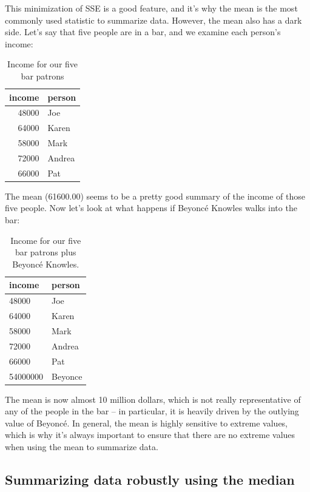 \documentclass[12pt,]{book}
\theoremstyle{definition}
\theoremstyle{definition}
\theoremstyle{definition}
\theoremstyle{remark}
\begin{document}
This minimization of SSE is a good feature, and it's why the mean is the most commonly used statistic to summarize data. However, the mean also has a dark side. Let's say that five people are in a bar, and we examine each person's income:

\begin{table}

\caption{\label{tab:unnamed-chunk-17}Income for our five bar patrons}
\centering
\begin{tabular}[t]{r|l}
\hline
income & person\\
\hline
48000 & Joe\\
\hline
64000 & Karen\\
\hline
58000 & Mark\\
\hline
72000 & Andrea\\
\hline
66000 & Pat\\
\hline
\end{tabular}
\end{table}

The mean (61600.00) seems to be a pretty good summary of the income of those five people. Now let's look at what happens if Beyoncé Knowles walks into the bar:

\begin{table}

\caption{\label{tab:unnamed-chunk-19}Income for our five bar patrons plus Beyoncé Knowles.}
\centering
\begin{tabular}[t]{l|l}
\hline
income & person\\
\hline
48000 & Joe\\
\hline
64000 & Karen\\
\hline
58000 & Mark\\
\hline
72000 & Andrea\\
\hline
66000 & Pat\\
\hline
54000000 & Beyonce\\
\hline
\end{tabular}
\end{table}

The mean is now almost 10 million dollars, which is not really representative of any of the people in the bar -- in particular, it is heavily driven by the outlying value of Beyoncé. In general, the mean is highly sensitive to extreme values, which is why it's always important to ensure that there are no extreme values when using the mean to summarize data.

\hypertarget{summarizing-data-robustly-using-the-median}{%
\subsection{Summarizing data robustly using the median}\label{summarizing-data-robustly-using-the-median}}
\end{document}

